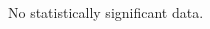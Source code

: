 \documentclass[conference]{IEEEtran}
\begin{document}
\subsection{\RQThree}
\begin{table*}[htb]
\begin{adjustbox}{width=\textwidth}
\end{adjustbox}
\end{table*}


\subsection{\RQFour}
No statistically significant data.

\subsection{\RQFive}

\begin{table*}[htb]
\begin{adjustbox}{width=\textwidth}
\end{adjustbox}
\end{table*}

\subsection{\RQSix}

\begin{table*}[h]
\begin{adjustbox}{width=\textwidth}
\end{adjustbox}
\end{table*}

\end{document}
